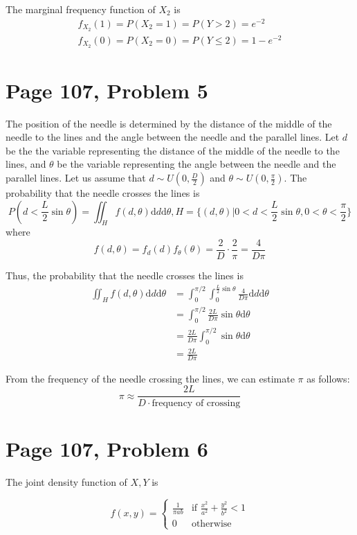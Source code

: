 \documentclass[a4paper, UTF-8]{article}
\theoremstyle{plain}
\begin{document}
The marginal frequency function of $X_2$ is
\begin{align*}
f_{X_2}(1) = P(X_2 = 1) = P(Y > 2) = e^{-2}\\
f_{X_2}(0) = P(X_2 = 0) = P(Y \leq 2) = 1 - e^{-2}
\end{align*}

\section{Page 107, Problem 5}

The position of the needle is determined by the distance of the middle of the needle to the lines and the angle between the needle 
and the parallel lines. Let $d$ be the the variable representing the distance of the middle of the needle to the lines, and 
$\theta$ be the variable representing the angle between the needle and the parallel lines. Let us assume that 
 $d \sim U(0, \frac{D}{2})$ and $\theta \sim U(0, \frac{\pi}{2})$. The probability that the needle crosses 
 the lines is 
$$
P(d < \frac{L}{2} \sin \theta) = \iint_{H} f(d, \theta) \mathrm{d}d \mathrm{d}\theta, H = \{(d, \theta) | 0 < d < \frac{L}{2} \sin \theta, 0 < \theta < \frac{\pi}{2}\}
$$
where 
$$
f(d, \theta) = f_d(d) f_\theta(\theta) = \frac{2}{D} \cdot \frac{2}{\pi} = \frac{4}{D\pi}
$$

Thus, the probability that the needle crosses the lines is
\begin{align*}
\iint_{H} f(d, \theta) \mathrm{d}d \mathrm{d}\theta &= \int_0^{\pi/2} \int_0^{\frac{L}{2} \sin \theta} \frac{4}{D\pi} \mathrm{d}d \mathrm{d}\theta\\
&= \int_0^{\pi/2} \frac{2L}{D\pi} \sin \theta \mathrm{d}\theta\\
&= \frac{2L}{D\pi} \int_0^{\pi/2} \sin \theta \mathrm{d}\theta\\
&= \frac{2L}{D\pi}
\end{align*}

From the frequency of the needle crossing the lines, we can estimate $\pi$ as follows:
$$
\pi \approx \frac{2L}{D \cdot \text{frequency of crossing}}
$$


\section{Page 107, Problem 6}

The joint density function of $X, Y$ is

$$
f(x, y) = \begin{cases}
\frac{1}{\pi ab} & \text{if } \frac{x^2}{a^2} + \frac{y^2}{b^2} < 1\\
0 & \text{otherwise}
\end{cases}
$$
\end{document}
